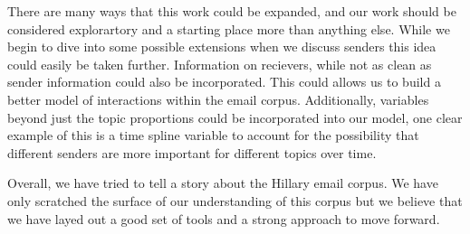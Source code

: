 \documentclass[12pt]{article}
\theoremstyle{definition}
\theoremstyle{algodesc}
\begin{document}
There are many ways that this work could be expanded, and our work should be considered explorartory and a starting place more than anything else.  While we begin to dive into some possible extensions when we discuss senders this idea could easily be taken further.  Information on recievers, while not as clean as sender information could also be incorporated.  This could allows us to build a better model of interactions within the email corpus.  Additionally, variables beyond just the topic proportions could be incorporated into our model, one clear example of this is a time spline variable to account for the possibility that different senders are more important for different topics over time.

Overall, we have tried to tell a story about the Hillary email corpus.  We have only scratched the surface of our understanding of this corpus but we believe that we have layed out a good set of tools and a strong approach to move forward.
\end{document}
